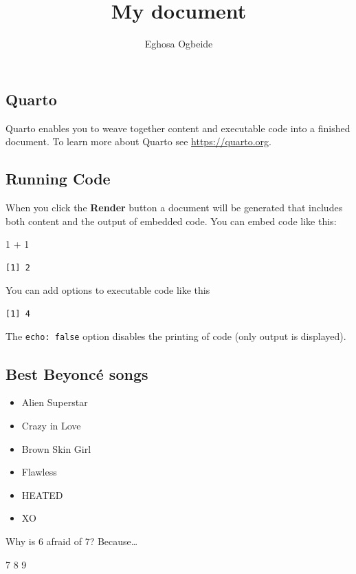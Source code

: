 \documentclass[
  letterpaper,
  DIV=11,
  numbers=noendperiod]{scrartcl}
\title{My document}
\author{Eghosa Ogbeide}
\date{}
\newenvironment{Shaded}{\begin{snugshade}}{\end{snugshade}}
\newcommand{\DecValTok}[1]{\textcolor[rgb]{0.68,0.00,0.00}{#1}}
\newcommand{\SpecialCharTok}[1]{\textcolor[rgb]{0.37,0.37,0.37}{#1}}
\providecommand{\tightlist}{%
  \setlength{\itemsep}{0pt}\setlength{\parskip}{0pt}}
\begin{document}
\maketitle


\subsection{Quarto}\label{quarto}

Quarto enables you to weave together content and executable code into a
finished document. To learn more about Quarto see
\url{https://quarto.org}.

\subsection{Running Code}\label{running-code}

When you click the \textbf{Render} button a document will be generated
that includes both content and the output of embedded code. You can
embed code like this:

\begin{Shaded}
\begin{Highlighting}[]
\DecValTok{1} \SpecialCharTok{+} \DecValTok{1}
\end{Highlighting}
\end{Shaded}

\begin{verbatim}
[1] 2
\end{verbatim}

You can add options to executable code like this

\begin{verbatim}
[1] 4
\end{verbatim}

The \texttt{echo:\ false} option disables the printing of code (only
output is displayed).

\subsection{Best Beyoncé songs}\label{best-beyoncuxe9-songs}

\begin{itemize}
\tightlist
\item
  Alien Superstar
\end{itemize}

\begin{itemize}
\tightlist
\item
  Crazy in Love
\end{itemize}

\begin{itemize}
\item
  Brown Skin Girl
\item
  Flawless
\item
  HEATED
\item
  XO
\end{itemize}

Why is 6 afraid of 7? Because\ldots{}

7 8 9
\end{document}
